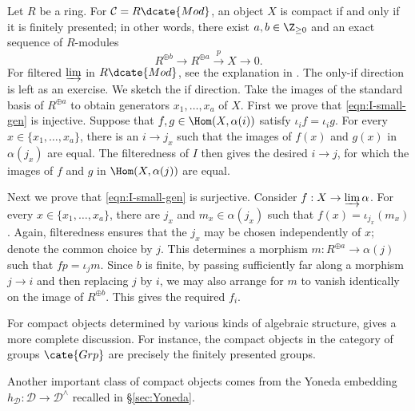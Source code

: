 \begin{example}\label{eg:Mod-cpt}
	Let $R$ be a ring. For $\mathcal{C}=R\dcate{Mod}$, an object $X$ is compact if and only if it is finitely presented; in other words, there exist $a,b\in\Z_{\geq0}$ and an exact sequence of $R$-modules
	\[ R^{\oplus b} \to R^{\oplus a} \xrightarrow{p} X \to 0 .\]
	For filtered $\varinjlim$ in $R\dcate{Mod}$, see the explanation in \cite[Remark 6.2.3]{Li1}. The only-if direction is left as an exercise. We sketch the if direction. Take the images of the standard basis of $R^{\oplus a}$ to obtain generators $x_1,\ldots,x_a$ of $X$. First we prove that \eqref{eqn:I-small-gen} is injective. Suppose that $f,g\in\Hom(X,\alpha(i))$ satisfy $\iota_i f=\iota_i g$. For every $x\in\{x_1,\ldots,x_a\}$, there is an $i\to j_x$ such that the images of $f(x)$ and $g(x)$ in $\alpha(j_x)$ are equal. The filteredness of $I$ then gives the desired $i\to j$, for which the images of $f$ and $g$ in $\Hom(X,\alpha(j))$ are equal.

	Next we prove that \eqref{eqn:I-small-gen} is surjective. Consider $f:X\to\varinjlim\alpha$. For every $x\in\{x_1,\ldots,x_a\}$, there are $j_x$ and $m_x\in\alpha(j_x)$ such that $f(x)=\iota_{j_x}(m_x)$. Again, filteredness ensures that the $j_x$ may be chosen independently of $x$; denote the common choice by $j$. This determines a morphism $m:R^{\oplus a}\to\alpha(j)$ such that $fp=\iota_jm$. Since $b$ is finite, by passing sufficiently far along a morphism $j\to i$ and then replacing $j$ by $i$, we may also arrange for $m$ to vanish identically on the image of $R^{\oplus b}$. This gives the required $f_i$.
\end{example}

For compact objects determined by various kinds of algebraic structure, \cite[Examples 1.2; Theorem 3.12]{AR94} gives a more complete discussion. For instance, the compact objects in the category of groups $\cate{Grp}$ are precisely the finitely presented groups.

Another important class of compact objects comes from the Yoneda embedding $h_{\mathcal{D}}:\mathcal{D}\to\mathcal{D}^\wedge$ recalled in \S\ref{sec:Yoneda}.

